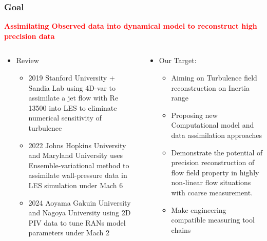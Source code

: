 \documentclass[aspectratio=169]{beamer}
\begin{document}
\begin{frame}[c]\frametitle{Goal}
	\textbf{\textcolor{red}{Assimilating Observed data into dynamical model to reconstruct high precision data}}
	\begin{columns}
		\begin{column}{0.5\textwidth}
			\begin{itemize}
				\item Review
				\begin{itemize}
					\item 2019 Stanford University + Sandia Lab using 4D-var to assimilate a jet flow with Re 13500 into LES to eliminate numerical sensitivity of turbulence
					\item 2022 Johns Hopkins University and Maryland University uses Ensemble-variational method to assimilate wall-pressure data in LES simulation under Mach 6
					\item 2024 Aoyama Gakuin University and Nagoya University using 2D PIV data to tune RANs model parameters under Mach 2 
				\end{itemize}
			\end{itemize}
		\end{column}
	\begin{column}{0.5\textwidth}
		\begin{itemize}
		\item Our Target:
		\begin{itemize}
			\item Aiming on Turbulence field reconstruction on Inertia range
			\item Proposing new Computational model and data assimilation approaches 
			\item Demonstrate the potential of precision reconstruction of flow field property in highly non-linear flow situations with coarse measurement.
			\item Make engineering compatible measuring tool chains
		\end{itemize}
	\end{itemize}
	\end{column}
	\end{columns}
\end{frame}
\end{document}
